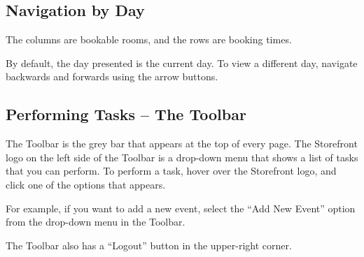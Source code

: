 \subsection{Navigation by Day}

The columns are bookable rooms, and the rows are booking times.

By default, the day presented is the current day. To view a different day, navigate backwards and forwards using the arrow buttons.


\subsection{Performing Tasks -- The Toolbar}

The Toolbar is the grey bar that appears at the top of every page. The Storefront logo on the left side of the Toolbar is a drop-down menu that shows a list of tasks that you can perform. To perform a task, hover over the Storefront logo, and click one of the options that appears.

For example, if you want to add a new event, select the ``Add New Event'' option from the drop-down menu in the Toolbar.

The Toolbar also has a ``Logout'' button in the upper-right corner.


